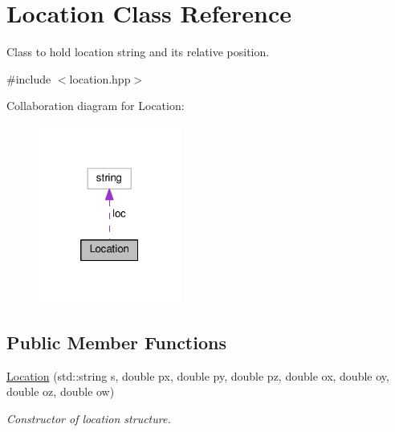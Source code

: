 \hypertarget{class_location}{}\section{Location Class Reference}
\label{class_location}


Class to hold location string and its relative position.  




{\ttfamily \#include $<$location.\+hpp$>$}



Collaboration diagram for Location\+:
\nopagebreak
\begin{figure}[H]
\begin{center}
\leavevmode
\includegraphics[width=133pt]{class_location__coll__graph}
\end{center}
\end{figure}
\subsection*{Public Member Functions}
\begin{DoxyCompactItemize}
\item 
\hyperlink{class_location_a6e102ed62f5903199805c169998feb20}{Location} (std\+::string s, double px, double py, double pz, double ox, double oy, double oz, double ow)
\begin{DoxyCompactList}\small\item\em Constructor of location structure. \end{DoxyCompactList}\end{DoxyCompactItemize}
